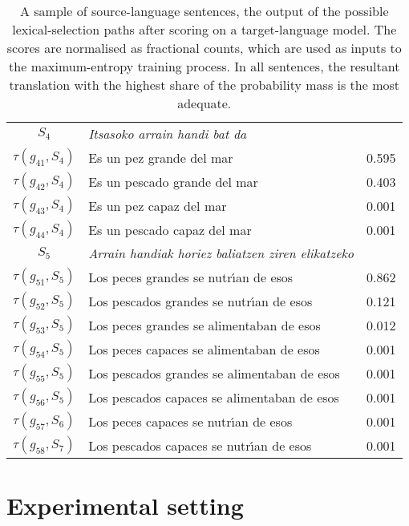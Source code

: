 \documentclass[11pt]{article}
\begin{document}
\begin{table}
\begin{center}
\begin{tabular}{|c|l|r|}
    \(S_4\) & \emph{Itsasoko arrain handi bat da} & \\
                        $\tau(g_{41},S_4)$ & Es un pez grande del mar & 0.595 \\
                        $\tau(g_{42},S_4)$ & Es un pescado grande del mar & 0.403 \\
                        $\tau(g_{43},S_4)$ & Es un pez capaz del mar & 0.001 \\
                        $\tau(g_{44},S_4)$ & Es un pescado capaz del mar & 0.001 \\
    \hline %
    $S_5$ &  \emph{Arrain handiak horiez baliatzen ziren elikatzeko} &  \\
                        $\tau(g_{51},S_5)$ & Los peces grandes se nutr\'{\i}an de esos & 0.862 \\
                        $\tau(g_{52},S_5)$ & Los pescados grandes se nutr\'{\i}an de esos & 0.121 \\
                        $\tau(g_{53},S_5)$ & Los peces grandes se alimentaban de esos & 0.012 \\
                        $\tau(g_{54},S_5)$ & Los peces capaces se alimentaban de esos & 0.001 \\
                        $\tau(g_{55},S_5)$ & Los pescados grandes se alimentaban de esos & 0.001 \\
                        $\tau(g_{56},S_5)$ & Los pescados capaces se alimentaban de esos & 0.001 \\
                        $\tau(g_{57},S_6)$ & Los peces capaces se nutr\'{\i}an de esos & 0.001 \\
                        $\tau(g_{58},S_7)$ & Los pescados capaces se nutr\'{\i}an de esos & 0.001 \\
    \hline
  
  \end{tabular}
  \caption{A sample of source-language sentences, the output of the
    possible lexical-selection paths after scoring on a
    target-language model. The scores are normalised as fractional
    counts, which are used as inputs to the maximum-entropy training
    process. In all sentences, the resultant translation with the highest share of the 
    probability mass is the most adequate.}
   \label{tb:workedexample}
 \end{center}
\end{table}


\section{Experimental setting}
\end{document}
